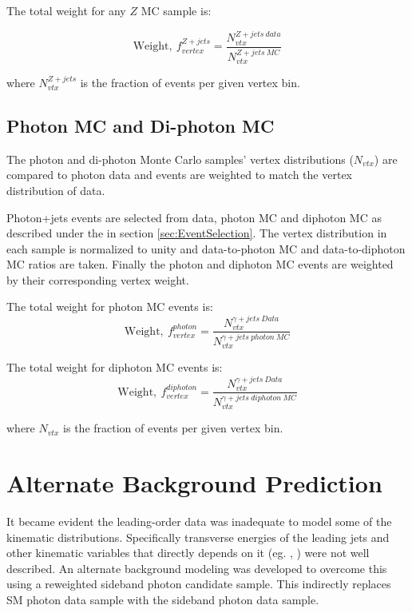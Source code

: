 \documentclass[11pt]{article}
\begin{document}
The total weight for any $Z$ MC sample is:

\begin{equation}
 \mathrm{Weight,}~f^{Z+jets}_{vertex}= \frac{N^{Z+jets~data}_{vtx}}{N^{Z+jets~MC}_{vtx}}
 \label{eqa:ZjetsWeights}
\end{equation}

\noindent where $N_{vtx}^{Z+jets}$ is the fraction of events per given vertex bin.


\subsection{Photon MC and Di-photon MC}\label{sec:phoMCcorrections}
The photon and di-photon Monte Carlo samples' vertex distributions ($N_{vtx}$) are compared to photon data and \MC events are weighted to match the vertex distribution of data.

Photon+jets events are selected from data, photon MC and diphoton MC as described under the  in section \ref{sec:EventSelection}. The vertex distribution in each sample is normalized to unity and data-to-photon MC and data-to-diphoton MC ratios are taken. Finally the photon and diphoton MC events are weighted by their corresponding vertex weight.

The total weight for photon MC events is:
\begin{equation}
 \mathrm{Weight,}~f_{vertex}^{photon} = \frac{N_{vtx}^{\gamma+jets~Data}}{N_{vtx}^{\gamma+jets~photon~MC}}
 \label{eqa:diphojetsWeights}
\end{equation}

The total weight for diphoton MC events is:
\begin{equation}
 \mathrm{Weight,}~f_{vertex}^{diphoton} = \frac{N_{vtx}^{\gamma+jets~Data}}{N_{vtx}^{\gamma+jets~diphoton~MC}}
 \label{eqa:phojetsWeights}
\end{equation}

\noindent where $N_{vtx}$ is the fraction of events per given vertex bin.

\section{Alternate Background Prediction}\label{sec:AltBgPrediction}

It became evident the leading-order \MC data was inadequate to model some of the kinematic distributions. Specifically transverse energies of the leading jets and other kinematic variables that directly depends on it (eg. \Ht, \met) were not well described. An alternate background modeling was developed to overcome this using a reweighted sideband photon candidate sample. This indirectly replaces SM photon \MC data sample with the sideband photon data sample.
\end{document}
